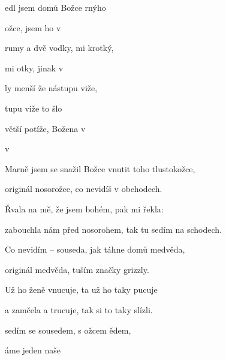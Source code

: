 

\zs
{}edl jsem domů Božce rnýho 

 ožce,  jsem ho 
v 

 rumy a dvě vodky,  mi  
krotký,

 mi otky,  jinak v 

ly menší že  nástupu viže,

tupu viže  to šlo 

 větší potíže,  Božena v 

 v   
\ks

\zs
Marně jsem se snažil Božce vnutit toho tlustokožce,

originál nosorožce, co nevidíš v obchodech.

Řvala na mě, že jsem bohém, pak mi řekla: 

zabouchla nám před nosorohem, tak tu sedím na schodech.

Co nevidím -- souseda, jak táhne domů medvěda,

originál medvěda, tuším značky grizzly.

Už ho ženě vnucuje, ta už ho taky pucuje

a zamčela a trucuje, tak si to taky slízli.
\ks

\zs
{} sedím se sousedem, s ožcem ědem,

áme  jeden  naše 
\ks

\kp


